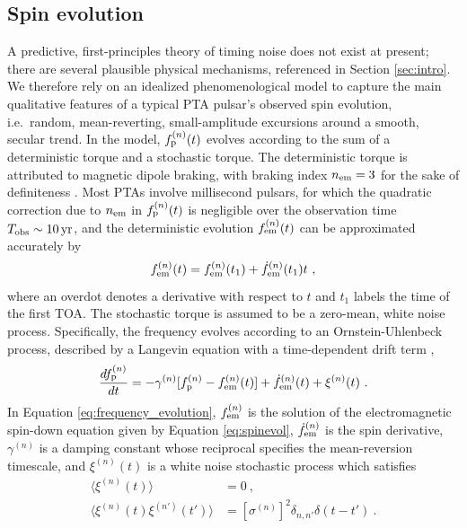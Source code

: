 \documentclass[fleqn,usenatbib,useAMS]{mnras}
\begin{document}
\subsection{Spin evolution} \label{sec:psr_frequency}
A predictive, first-principles theory of timing noise does not exist at present; there are several plausible physical mechanisms, referenced in Section \ref{sec:intro}. We therefore rely on an idealized phenomenological model to capture the main qualitative features of a typical PTA pulsar's observed spin evolution, i.e.\ random, mean-reverting, small-amplitude excursions around a smooth, secular trend. In the model, $f_{\rm p}^{(n)}(t)$ evolves according to the sum of a deterministic torque and a stochastic torque. The deterministic torque is attributed to magnetic dipole braking, with braking index $n_{\rm em}=3$ for the sake of definiteness \citep{1969ApJ...157..869G}. Most PTAs involve millisecond pulsars, for which the quadratic correction due to $n_{\rm em}$ in $f_{\rm p}^{(n)}(t)$ is negligible over the observation time $T_{\rm obs} \sim 10 \, {\rm yr}$, and the deterministic evolution $f_{\rm em}^{(n)}(t)$ can be approximated accurately by 
\begin{equation}
 f_{\rm em}^{(n)}(t) = f_{\rm em}^{(n)}(t_1) + \dot{f}_{\rm em}^{(n)}(t_1)t \ , \label{eq:spinevol}
\end{equation} where an overdot denotes a derivative with respect to $t$ and $t_1$ labels the time of the first TOA. The stochastic torque is assumed to be a zero-mean, white noise process. Specifically, the frequency evolves according to an Ornstein-Uhlenbeck process, described by a Langevin equation with a time-dependent drift term \citep{Vargas},
\begin{equation}
	\frac{df_{\rm p}^{(n)}}{dt} = -\gamma^{(n)}	 [f_{\rm p}^{(n)} - f_{\rm em}^{(n)} (t)] + \dot{f}_{\rm em}^{(n)}(t) +\xi^{(n)}(t) \ . 
	\label{eq:frequency_evolution}
\end{equation}
In Equation \eqref{eq:frequency_evolution}, $f_{\rm em}^{(n)}$ is the solution of the electromagnetic spin-down equation given by Equation \eqref{eq:spinevol}, $\dot{f}_{\rm em}^{(n)}$ is the spin derivative, $\gamma^{(n)}$ is a damping constant whose reciprocal specifies the mean-reversion timescale, and $\xi^{(n)}(t)$ is a white noise stochastic process which satisfies
\begin{align}
	\langle \xi^{(n)}(t) \rangle &= 0 \ , \\
	\langle \xi^{(n)}(t) \xi^{(n')}(t') \rangle &= [\sigma^{(n)}]^2 \delta_{n,n'} \delta (t - t') \ .	\label{eq:xieqn}
\end{align}
\end{document}
